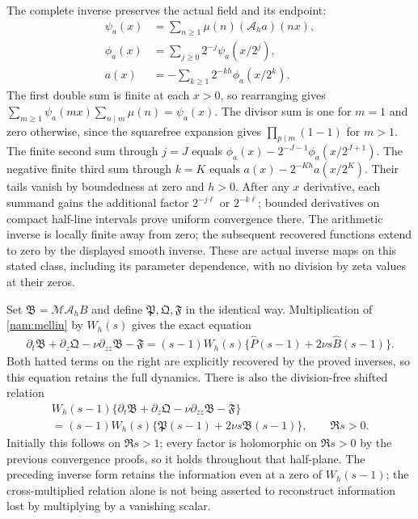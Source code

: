 The complete inverse preserves the actual field and its endpoint:
\begin{align*}
 \psi_a(x)&=\sum_{n\geq1}\mu(n)(\mathcal A_ha)(nx),\\
 \phi_a(x)&=\sum_{j\geq0}2^{-j}\psi_a(x/2^j),\\
 a(x)&=-\sum_{k\geq1}2^{-kh}\phi_a(x/2^k).
\end{align*}
The first double sum is finite at each $x>0$, so rearranging gives
$\sum_{m\geq1}\psi_a(mx)\sum_{n\mid m}\mu(n)=\psi_a(x)$.
The divisor sum is one for $m=1$ and zero otherwise, since the
squarefree expansion gives $\prod_{p\mid m}(1-1)$ for $m>1$.
The finite second sum through $j=J$ equals
$\phi_a(x)-2^{-J-1}\phi_a(x/2^{J+1})$.
The negative finite third sum through $k=K$ equals
$a(x)-2^{-Kh}a(x/2^K)$. Their tails vanish by boundedness at zero
and $h>0$. After any $x$ derivative, each summand gains the additional
factor $2^{-j\ell}$ or $2^{-k\ell}$; bounded derivatives on compact
half-line intervals prove uniform convergence there. The arithmetic
inverse is locally finite away from zero; the subsequent recovered
functions extend to zero by the displayed smooth inverse. These are
actual inverse maps on this stated class, including its parameter
dependence, with no division by zeta values at their zeros.

Set $\mathfrak B=\mathcal M\mathcal A_hB$ and define
$\mathfrak P,\mathfrak Q,\mathfrak F$ in the identical way.
Multiplication of \eqref{nam:mellin} by $W_h(s)$ gives the exact
equation
\begin{align*}
 \partial_t\mathfrak B+\partial_z\mathfrak Q
       -\nu\partial_{zz}\mathfrak B-\mathfrak F
  =(s-1)W_h(s)\{\widehat P(s-1)+2\nu s\widehat B(s-1)\}.
\end{align*}
Both hatted terms on the right are explicitly recovered by the
proved inverses, so this equation retains the full dynamics. There is
also the division-free shifted relation
\begin{equation}
 \begin{gathered}
 W_h(s-1)\{\partial_t\mathfrak B+\partial_z\mathfrak Q
       -\nu\partial_{zz}\mathfrak B-\mathfrak F\}\\
  =(s-1)W_h(s)\{\mathfrak P(s-1)
                        +2\nu s\mathfrak B(s-1)\},
 \qquad\Re s>0.
 \end{gathered}
 \label{nam:arithmeticpde}
\end{equation}
Initially this follows on $\Re s>1$; every factor is holomorphic on
$\Re s>0$ by the previous convergence proofs, so it holds throughout
that half-plane. The preceding inverse form retains the information
even at a zero of $W_h(s-1)$; the cross-multiplied relation alone is
not being asserted to reconstruct information lost by multiplying
by a vanishing scalar.

